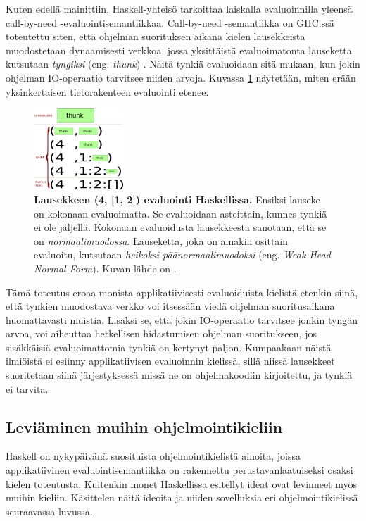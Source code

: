 Kuten edellä mainittiin, Haskell-yhteisö tarkoittaa laiskalla evaluoinnilla yleensä call-by-need -evaluointisemantiikkaa. Call-by-need -semantiikka on GHC:ssä toteutettu siten, että ohjelman suorituksen aikana kielen lausekkeista muodostetaan dynaamisesti verkkoa, jossa yksittäistä evaluoimatonta lauseketta kutsutaan \textit{tyngiksi} (eng. \textit{thunk}) \citep{hudak2007history}. Näitä tynkiä evaluoidaan sitä mukaan, kun jokin ohjelman IO-operaatio tarvitsee niiden arvoja. Kuvassa \ref{figure:thunk} näytetään, miten erään yksinkertaisen tietorakenteen evaluointi etenee.
\begin{figure}[h]
  \centering
    \includegraphics[width=0.3\textwidth]{figure-thunk-layers}
  \caption{\footnotesize\textbf{Lausekkeen (4, [1, 2]) evaluointi Haskellissa.} Ensiksi lauseke on kokonaan evaluoimatta. Se evaluoidaan asteittain, kunnes tynkiä ei ole jäljellä. Kokonaan evaluoidusta lausekkeesta sanotaan, että se on \textit{normaalimuodossa}. Lauseketta, joka on ainakin osittain evaluoitu, kutsutaan \textit{heikoksi päänormaalimuodoksi} (eng. \textit{Weak Head Normal Form}). Kuvan lähde on \citet{wikicommonsthunk}.}
  \label{figure:thunk}
\end{figure}

Tämä toteutus eroaa monista applikatiivisesti evaluoiduista kielistä etenkin siinä, että tynkien muodostava verkko voi itsessään viedä ohjelman suoritusaikana huomattavasti muistia. Lisäksi se, että jokin IO-operaatio tarvitsee jonkin tyngän arvoa, voi aiheuttaa hetkellisen hidastumisen ohjelman suoritukseen, jos sisäkkäisiä evaluoimattomia tynkiä on kertynyt paljon. Kumpaakaan näistä ilmiöistä ei esiinny applikatiivisen evaluoinnin kielissä, sillä niissä lausekkeet suoritetaan siinä järjestyksessä missä ne on ohjelmakoodiin kirjoitettu, ja tynkiä ei tarvita.

\subsection{Leviäminen muihin ohjelmointikieliin}

Haskell on nykypäivänä suosituista ohjelmointikielistä ainoita, joissa applikatiivinen evaluointisemantiikka on rakennettu perustavanlaatuiseksi osaksi kielen toteutusta. Kuitenkin monet Haskellissa esitellyt ideat ovat levinneet myös muihin kieliin. Käsittelen näitä ideoita ja niiden sovelluksia eri ohjelmointikielissä seuraavassa luvussa.
